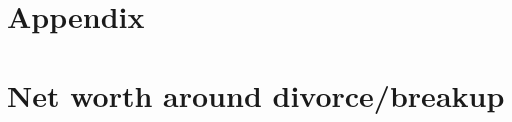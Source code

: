 \documentclass[12pt]{article}
\numberwithin{table}{section}
\begin{document}

%


\appendix

\section*{Appendix}
\section{Net worth around divorce/breakup}\label{section:eventsa}
\end{document}
